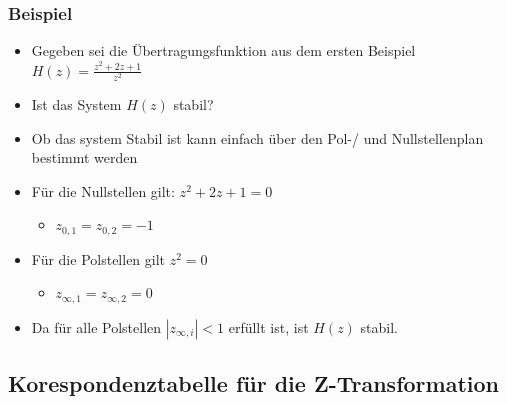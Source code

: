 \documentclass[11pt]{article}
\providecommand{\tightlist}{%
      \setlength{\itemsep}{0pt}\setlength{\parskip}{0pt}}
\begin{document}
    \subsubsection{Beispiel}\label{beispiel}

\begin{itemize}
\item
  Gegeben sei die Übertragungsfunktion aus dem ersten Beispiel
  \(H(z) = \frac{z^2 + 2z + 1}{z^2}\)
\item
  Ist das System \(H(z)\) stabil?
\item
  Ob das system Stabil ist kann einfach über den Pol-/ und
  Nullstellenplan bestimmt werden
\item
  Für die Nullstellen gilt: \(z^2 + 2z + 1 = 0\)

  \begin{itemize}
  \tightlist
  \item
    \(z_{0,1} = z_{0,2} = -1\)
  \end{itemize}
\item
  Für die Polstellen gilt \(z^2 = 0\)

  \begin{itemize}
  \tightlist
  \item
    \(z_{\infty,1} = z_{\infty,2} = 0\)
  \end{itemize}
\item
  Da für alle Polstellen \(|z_{\infty,i}| < 1\) erfüllt ist, ist
  \(H(z)\) stabil.
\end{itemize}

    \subsection{Korespondenztabelle für die
Z-Transformation}\label{korespondenztabelle-fuxfcr-die-z-transformation}
\end{document}
